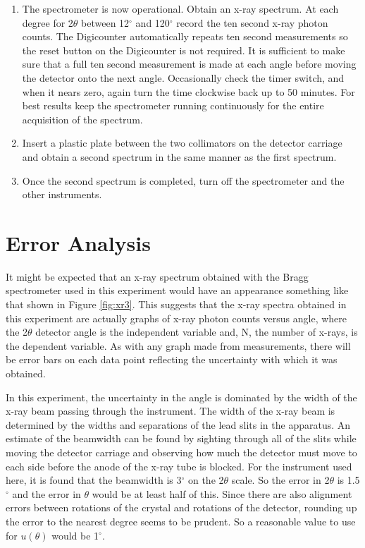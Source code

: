 \begin{enumerate}
\item The spectrometer is now operational. Obtain an x-ray spectrum. At each degree for 2$\theta$ between 12$^{\circ}$ and 120$^{\circ}$ record the ten second x-ray photon counts. The Digicounter automatically repeats ten second measurements so the reset button on the Digicounter is not required. It is sufficient to make sure that a full ten second measurement is made at each angle before moving the detector onto the next angle. Occasionally check the timer switch, and when it nears zero, again turn the time clockwise back up to 50 minutes. For best results keep the spectrometer running continuously for the entire acquisition of the spectrum.

\item Insert a plastic plate between the two collimators on the detector carriage and obtain a second spectrum in the same manner as the first spectrum.

\item Once the second spectrum is completed, turn off the spectrometer and the other instruments.
\end{enumerate}

\section{Error Analysis}
It might be expected that an x-ray spectrum obtained with the Bragg spectrometer used in this experiment would have an appearance something like that shown in Figure \ref{fig:xr3}. This suggests that the x-ray spectra obtained in this experiment are actually graphs of x-ray photon counts versus angle, where the 2$\theta$ detector angle is the independent variable and, N, the number of x-rays, is the dependent variable. As with any graph made from measurements, there will be error bars on each data point reflecting the uncertainty with which it was obtained.

In this experiment, the uncertainty in the angle is dominated by the width of the x-ray beam passing through the instrument. The width of the x-ray beam is determined by the widths and separations of the lead slits in the apparatus. An estimate of the beamwidth can be found by sighting through all of the slits while moving the detector carriage and observing how much the detector must move to each side before the anode of the x-ray tube is blocked. For the instrument used here, it is found that the beamwidth is 3$^{\circ}$ on the 2$\theta$ scale. So the error in 2$\theta$ is 1.5$^{\circ}$ and the error in $\theta$ would be at least half of this. Since there are also alignment errors between rotations of the crystal and rotations of the detector, rounding up the error to the nearest degree seems to be prudent. So a reasonable value to use for $u(\theta)$ would be 1$^{\circ}$.

